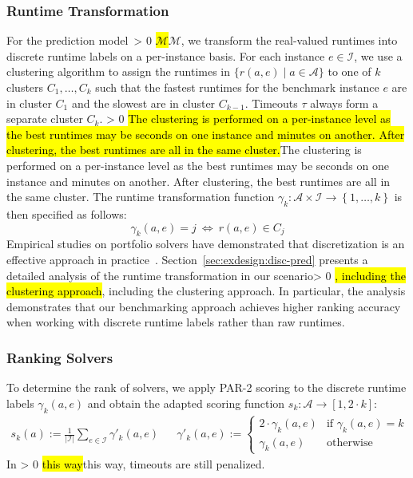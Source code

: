 \documentclass[sn-basic, Numbered]{sn-jnl} %
\newcommand{\showchanges}{1} %
\newcommand{\change}[1]{\ifnum \showchanges > 0 \sethlcolor{yellow}\hl{#1}\else#1\fi}
\begin{document}
\subsubsection{Runtime Transformation}
\label{sec:main:model:transformation}

For the prediction model~\change{$\mathcal{M}$}, we transform the real-valued runtimes into discrete runtime labels on a per-instance basis.
For each instance $e \in \mathcal{I}$, we use a clustering algorithm to assign the runtimes in $\bigl\{ r(a, e) \mid a \in \mathcal{A} \bigr\}$ to one of $k$ clusters $C_1, \dots, C_k$ such that the fastest runtimes for the benchmark instance $e$ are in cluster $C_1$ and the slowest are in cluster $C_{k-1}$.
Timeouts $\tau$ always form a separate cluster $C_{k}$.
\change{The clustering is performed on a per-instance level as the best runtimes may be seconds on one instance and minutes on another.
After clustering, the best runtimes are all in the same cluster.}
The runtime transformation function $\gamma_k : {\mathcal{A} \times \mathcal{I}} \rightarrow \left\lbrace 1, \dots, k \right\rbrace$ is then specified as follows:
%
$$\gamma_k(a, e) = j ~\Leftrightarrow~ r(a, e) \in C_j$$
%
Empirical studies on portfolio solvers have demonstrated that discretization is an effective approach in practice~\cite{CollauttiMMO13,NgokoCT19}.
Section~\ref{sec:exdesign:disc-pred} presents a detailed analysis of the runtime transformation in our scenario\change{, including the clustering approach}.
In particular, the analysis demonstrates that our benchmarking approach achieves higher ranking accuracy when working with discrete runtime labels rather than raw runtimes.

\subsubsection{Ranking Solvers}
\label{sec:main:model:ranking}

To determine the rank of solvers, we apply PAR-2 scoring to the discrete runtime labels $\gamma_k(a, e)$ and obtain the adapted scoring function $s_k : \mathcal{A} \rightarrow [1, 2 \cdot k]$:
%
\begin{align}
  s_k(a) := \frac{1}{|\mathcal{I}|} \sum_{e \in \mathcal{I}} \gamma'_k(a, e)
  &&
  \gamma'_k(a, e) := \begin{cases}
    2 \cdot \gamma_k(a, e)   & \text{if } \gamma_k(a, e) = k\\
  \gamma_k(a, e)  & \text{otherwise}
  \end{cases}
  \label{eq:rankingeq}
\end{align}
%
In \change{this way}, timeouts are still penalized.
\end{document}

